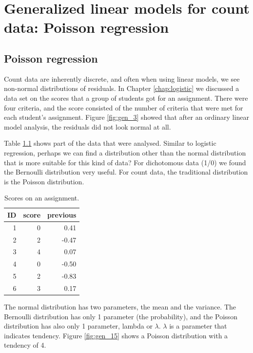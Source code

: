 \documentclass[]{report}\usepackage[]{graphicx}\usepackage[]{color}
\begin{document}





\chapter{Generalized linear models for count data: Poisson regression}\label{chap:poisson}


\section{Poisson regression}


Count data are inherently discrete, and often when using linear models, we see non-normal distributions of residuals. In Chapter \ref{chap:logistic} we discussed a data set on the scores that a group of students got for an assignment. There were four criteria, and the score consisted of the number of criteria that were met for each student's assignment. Figure \ref{fig:gen_3} showed that after an ordinary linear model analysis, the residuals did not look normal at all.

Table \ref{tab:gen_14} shows part of the data that were analysed. Similar to logistic regression, perhaps we can find a distribution other than the normal distribution that is more suitable for this kind of data? For dichotomous data (1/0) we found the Bernoulli distribution very useful. For count data, the traditional distribution is the Poisson distribution.


\begin{table}[ht]
\centering
\caption{Scores on an assignment.} 
\label{tab:gen_14}
\begin{tabular}{rrr}
  \hline
ID & score & previous \\ 
  \hline
1 & 0 & 0.41 \\ 
  2 & 2 & -0.47 \\ 
  3 & 4 & 0.07 \\ 
  4 & 0 & -0.50 \\ 
  5 & 2 & -0.83 \\ 
  6 & 3 & 0.17 \\ 
   \hline
\end{tabular}
\end{table}


The normal distribution has two parameters, the mean and the variance. The Bernoulli distribution has only 1 parameter (the probability), and the Poisson distribution has also only 1 parameter, lambda or $\lambda$. $\lambda$ is a parameter that indicates tendency. Figure \ref{fig:gen_15} shows a Poisson distribution with a tendency of 4.
\end{document}
